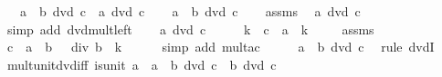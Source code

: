 \begin{isabellebody}
\ \ \ {\isachardoublequoteopen}a\ {\isacharasterisk}{\kern0pt}\ b\ dvd\ c\ {\isasymlongleftrightarrow}\ a\ dvd\ c{\isachardoublequoteclose}\isanewline
%
\isadelimproof
%
\endisadelimproof
%
\isatagproof
{}\isamarkupfalse%
\isanewline
\ \ \isamarkupfalse%
\ {\isachardoublequoteopen}a\ {\isacharasterisk}{\kern0pt}\ b\ dvd\ c{\isachardoublequoteclose}\isanewline
\ \ \isamarkupfalse%
\ assms\ \isamarkupfalse%
\ {\isachardoublequoteopen}a\ dvd\ c{\isachardoublequoteclose}\isanewline
\ \ \ \ \isamarkupfalse%
\ {\isacharparenleft}{\kern0pt}simp\ add{\isacharcolon}{\kern0pt}\ dvd{\isacharunderscore}{\kern0pt}mult{\isacharunderscore}{\kern0pt}left{\isacharparenright}{\kern0pt}\isanewline
{}\isamarkupfalse%
\isanewline
\ \ \isamarkupfalse%
\ {\isachardoublequoteopen}a\ dvd\ c{\isachardoublequoteclose}\isanewline
\ \ \isamarkupfalse%
\ \isamarkupfalse%
\ k\ \ {\isachardoublequoteopen}c\ {\isacharequal}{\kern0pt}\ a\ {\isacharasterisk}{\kern0pt}\ k{\isachardoublequoteclose}\ \isacommand{{\isachardot}{\kern0pt}{\isachardot}{\kern0pt}}\isamarkupfalse%
\isanewline
\ \ \isamarkupfalse%
\ assms\ \isamarkupfalse%
\ {\isachardoublequoteopen}c\ {\isacharequal}{\kern0pt}\ {\isacharparenleft}{\kern0pt}a\ {\isacharasterisk}{\kern0pt}\ b{\isacharparenright}{\kern0pt}\ {\isacharasterisk}{\kern0pt}\ {\isacharparenleft}{\kern0pt}{}\ div\ b\ {\isacharasterisk}{\kern0pt}\ k{\isacharparenright}{\kern0pt}{\isachardoublequoteclose}\isanewline
\ \ \ \ \isamarkupfalse%
\ {\isacharparenleft}{\kern0pt}simp\ add{\isacharcolon}{\kern0pt}\ mult{\isacharunderscore}{\kern0pt}ac{\isacharparenright}{\kern0pt}\isanewline
\ \ \isamarkupfalse%
\ \isamarkupfalse%
\ {\isachardoublequoteopen}a\ {\isacharasterisk}{\kern0pt}\ b\ dvd\ c{\isachardoublequoteclose}\ \isamarkupfalse%
\ {\isacharparenleft}{\kern0pt}rule\ dvdI{\isacharparenright}{\kern0pt}\isanewline
{}\isamarkupfalse%
%
\endisatagproof
{\isafoldproof}%
%
\isadelimproof
\isanewline
%
\endisadelimproof
\isanewline
{}\isamarkupfalse%
\ mult{\isacharunderscore}{\kern0pt}unit{\isacharunderscore}{\kern0pt}dvd{\isacharunderscore}{\kern0pt}iff{\isacharprime}{\kern0pt}{\isacharcolon}{\kern0pt}\ {\isachardoublequoteopen}is{\isacharunderscore}{\kern0pt}unit\ a\ {\isasymLongrightarrow}\ {\isacharparenleft}{\kern0pt}a\ {\isacharasterisk}{\kern0pt}\ b{\isacharparenright}{\kern0pt}\ dvd\ c\ {\isasymlongleftrightarrow}\ b\ dvd\ c{\isachardoublequoteclose}\isanewline

\end{isabellebody}
